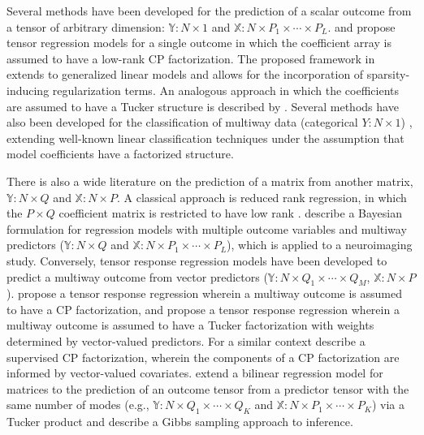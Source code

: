 \documentclass[12pt]{article}
\def\ctimes{\times \cdots \times}
\def\XX{\mathbb{X}}
\def\YY{\mathbb{Y}}
\begin{document}
 Several methods have been developed for the prediction of a scalar outcome from a tensor of arbitrary dimension: $\YY: N \times 1$ and $\XX: N \times P_1 \ctimes P_L$.  \citet{zhou2013tensor} and \citet{guo2012tensor} propose tensor regression models for a single outcome in which the coefficient array is assumed to have a low-rank CP factorization.  The proposed framework in \citet{zhou2013tensor} extends to generalized linear models and allows for the incorporation of sparsity-inducing regularization terms.  An analogous approach in which the coefficients are assumed to have a Tucker structure is described by \citet{li2013}. Several methods have also been developed for the classification of multiway data (categorical $Y: N \times 1$) \citep{tao2007supervised,wimalawarne2016,lyu2017discriminating}, extending well-known linear classification techniques under the assumption that model coefficients have a factorized structure. 
 
There is also a wide literature on the prediction of a matrix from another matrix, $\YY: N \times Q$ and $\XX: N \times P$. A classical approach is reduced rank regression, in which the $P \times Q$ coefficient matrix is restricted to have low rank \citep{izenman1975reduced,mukherjee2011reduced}.  \citet{miranda2015} describe a Bayesian formulation for regression models with multiple outcome variables and multiway predictors ($\YY: N \times Q$ and $\XX: N \times P_1 \ctimes P_L$), which is applied to a neuroimaging study.   Conversely, tensor response regression models have been developed to predict a multiway outcome from vector predictors ($\YY: N \times Q_1 \ctimes Q_M$, $\XX: N \times P$).    \citet{sun2016sparse} propose a tensor response regression wherein a multiway outcome is assumed to have a CP factorization, and  \citet{li2016parsimonious} propose a tensor response regression wherein a multiway outcome is assumed to have a Tucker factorization with weights determined by vector-valued predictors.  For a similar context \citet{lock2016supervised} describe a supervised CP factorization, wherein the components of a CP factorization are informed by vector-valued covariates.    \cite{hoff2015multilinear} extend a bilinear regression model for matrices to the prediction of an outcome tensor from a predictor tensor with the same number of modes (e.g., $\YY: N \times Q_1 \ctimes Q_K$ and $\XX: N \times P_1 \ctimes P_K$) via a Tucker product and describe a Gibbs sampling approach to inference.      
 
\end{document}
